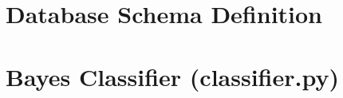 \newpage \appendix \appendixpage \addappheadtotoc
\section{Database Schema Definition}


\section{\Naive Bayes Classifier (classifier.py)}
